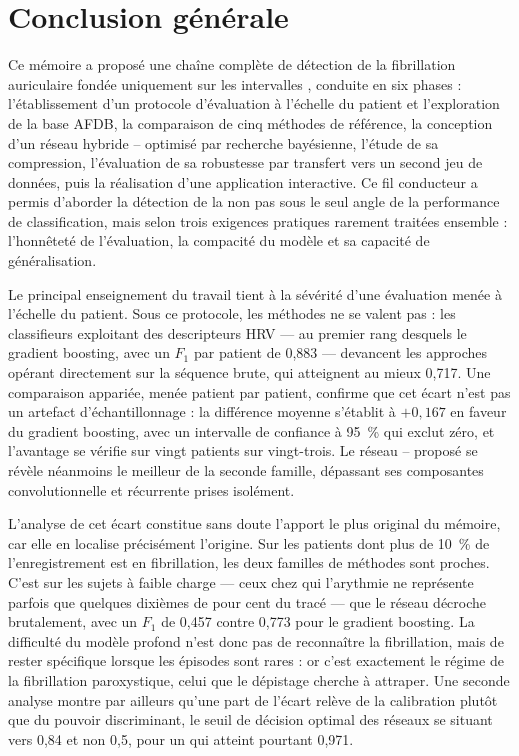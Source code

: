 \chapter*{Conclusion générale}
\label{ch:conclusion}

Ce mémoire a proposé une chaîne complète de détection de la fibrillation auriculaire fondée uniquement sur les intervalles \RR{}, conduite en six phases : l'établissement d'un protocole d'évaluation à l'échelle du patient et l'exploration de la base AFDB, la comparaison de cinq méthodes de référence, la conception d'un réseau hybride \CNN--\LSTM{} optimisé par recherche bayésienne, l'étude de sa compression, l'évaluation de sa robustesse par transfert vers un second jeu de données, puis la réalisation d'une application interactive. Ce fil conducteur a permis d'aborder la détection de la \FA{} non pas sous le seul angle de la performance de classification, mais selon trois exigences pratiques rarement traitées ensemble : l'honnêteté de l'évaluation, la compacité du modèle et sa capacité de généralisation.

Le principal enseignement du travail tient à la sévérité d'une évaluation menée à l'échelle du patient. Sous ce protocole, les méthodes ne se valent pas : les classifieurs exploitant des descripteurs HRV — au premier rang desquels le gradient boosting, avec un \(F_1\) par patient de 0,883 — devancent les approches opérant directement sur la séquence \RR{} brute, qui atteignent au mieux 0,717. Une comparaison appariée, menée patient par patient, confirme que cet écart n'est pas un artefact d'échantillonnage : la différence moyenne s'établit à \(+0{,}167\) en faveur du gradient boosting, avec un intervalle de confiance à 95~\% qui exclut zéro, et l'avantage se vérifie sur vingt patients sur vingt-trois. Le réseau \CNN--\LSTM{} proposé se révèle néanmoins le meilleur de la seconde famille, dépassant ses composantes convolutionnelle et récurrente prises isolément.

L'analyse de cet écart constitue sans doute l'apport le plus original du mémoire, car elle en localise précisément l'origine. Sur les patients dont plus de 10~\% de l'enregistrement est en fibrillation, les deux familles de méthodes sont proches. C'est sur les sujets à faible charge — ceux chez qui l'arythmie ne représente parfois que quelques dixièmes de pour cent du tracé — que le réseau décroche brutalement, avec un \(F_1\) de 0,457 contre 0,773 pour le gradient boosting. La difficulté du modèle profond n'est donc pas de reconnaître la fibrillation, mais de rester spécifique lorsque les épisodes sont rares : or c'est exactement le régime de la fibrillation paroxystique, celui que le dépistage cherche à attraper. Une seconde analyse montre par ailleurs qu'une part de l'écart relève de la calibration plutôt que du pouvoir discriminant, le seuil de décision optimal des réseaux se situant vers 0,84 et non 0,5, pour un \AUROC{} qui atteint pourtant 0,971.

